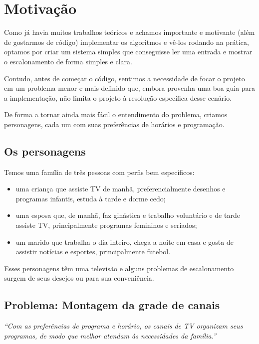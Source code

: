 \section{Motivação}

Como já havia muitos trabalhos teóricos e achamos importante e motivante (além de gostarmos de código) implementar os algoritmos e vê-los rodando na prática, optamos por criar um  sistema simples que conseguisse ler uma entrada e mostrar o escalonamento de forma simples e clara.

Contudo, antes de começar o código, sentimos a necessidade de focar o projeto em um problema menor e mais definido que, embora provenha uma boa guia para a implementação, não limita o projeto à resolução específica desse cenário.

De forma a tornar ainda mais fácil o entendimento do problema, criamos personagens, cada um com suas preferências de horários e programação.


\subsection{Os personagens}

Temos uma família de três pessoas com perfis bem específicos:

\begin{itemize}
	\item{uma criança que assiste TV de manhã, preferencialmente desenhos e programas infantis, estuda à tarde e dorme cedo;}
	\item{uma esposa que, de manhã, faz ginástica e trabalho voluntário e de tarde assiste TV, principalmente programas femininos e seriados;}
	\item{um marido que trabalha o dia inteiro, chega a noite em casa e gosta de assistir notícias e esportes, principalmente futebol.}
\end{itemize}

Esses personagens têm uma televisão e alguns problemas de escalonamento surgem de seus desejos ou para sua conveniência.

\subsection*{Problema: Montagem da grade de canais}

\textit{``Com as preferências de programa e horário, os canais de TV organizam seus programas, de modo que melhor atendam às necessidades da família.''}

